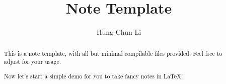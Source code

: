 \documentclass[a4paper]{report}
\author{Hung-Chun Li}
\title{Note Template}
\begin{document}
\maketitle

\begin{abstract}
	This is a note template, with all but minimal compilable files provided. Feel free to adjust for your usage.

	Now let's start a simple demo for you to take fancy notes in \LaTeX!
\end{abstract}

\newpage

\tableofcontents


\newpage
\appendix
\appendixpage{}



\newpage
\pagestyle{plain}
\printbibliography{}
\end{document}
